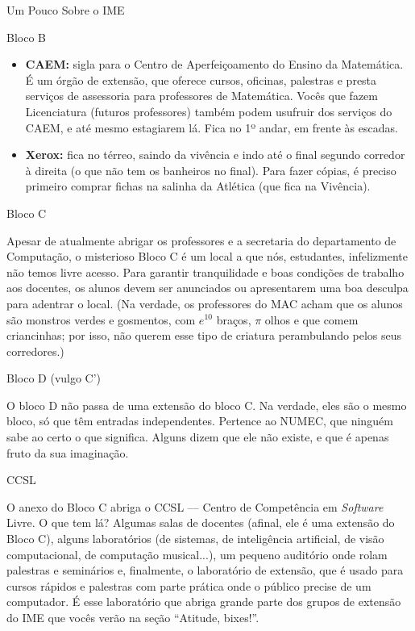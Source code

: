 \begin{secao}{Um Pouco Sobre o IME}
\begin{subsecao}{Bloco B}
\begin{itemize}
\item {\bf CAEM:} sigla para o Centro de Aperfeiçoamento do Ensino da
  Matemática. É um órgão de extensão, que oferece cursos, oficinas, palestras e
  presta serviços de assessoria para professores de Matemática. Vocês que fazem
  Licenciatura (futuros professores) também podem usufruir dos serviços do CAEM,
  e até mesmo estagiarem lá. Fica no 1º andar, em frente às escadas.

\item{\bf Xerox:} fica no térreo, saindo da vivência e indo até o final segundo
  corredor à direita (o que não tem os banheiros no final). Para fazer cópias,
  é preciso primeiro comprar fichas na salinha da Atlética (que fica na Vivência).
\end{itemize}

\end{subsecao}

\begin{subsecao}{Bloco C}

Apesar de atualmente abrigar os professores e a secretaria do departamento de
Computação, o misterioso Bloco C é um local a que nós, estudantes, infelizmente não
temos livre acesso. Para garantir tranquilidade e boas condições de trabalho aos
docentes, os alunos devem ser anunciados ou apresentarem uma boa desculpa para
adentrar o local. (Na verdade, os professores do MAC acham que os alunos são monstros
verdes e gosmentos, com $e^{10}$ braços, $\pi$ olhos e que comem criancinhas;
por isso, não querem esse tipo de criatura perambulando pelos seus corredores.)

\end{subsecao}

\begin{subsecao}{Bloco D (vulgo C')}

O bloco D não passa de uma extensão do bloco C. Na verdade, eles são o mesmo bloco,
só que têm entradas independentes. Pertence ao NUMEC, que ninguém sabe ao certo
o que significa. Alguns dizem que ele não existe, e que é apenas fruto da sua
imaginação.

\end{subsecao}

\begin{subsecao}{CCSL}

O anexo do Bloco C abriga o CCSL --- Centro de Competência em \textit{Software}
Livre. O que tem lá? Algumas salas de docentes (afinal, ele é uma extensão do
Bloco C), alguns laboratórios (de sistemas, de inteligência artificial,
de visão computacional, de computação musical...), um pequeno auditório
onde rolam palestras e seminários e, finalmente, o laboratório de extensão,
que é usado para cursos rápidos e palestras com parte prática onde o público
precise de um computador. É esse laboratório que abriga grande parte dos grupos
de extensão do IME que vocês verão na seção ``Atitude, bixes!''.


\end{subsecao}
\end{secao}
